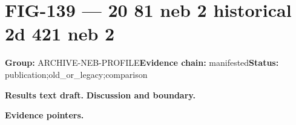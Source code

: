 \clearpage
\section{FIG-139 --- 20 81 neb 2 historical 2d 421 neb 2}
\label{figpage:fig-139}
\textbf{Group:} ARCHIVE-NEB-PROFILE\quad \textbf{Evidence chain:} manifested\quad \textbf{Status:} publication;old\_or\_legacy;comparison

\textbf{Results text draft.} 
\textbf{Discussion and boundary.} 


\textbf{Evidence pointers.}



\vfill
